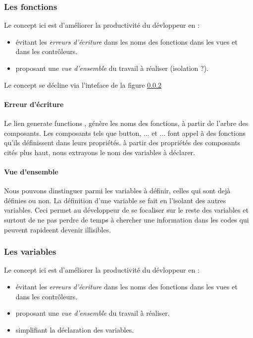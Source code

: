 \documentclass[a4paper,11pt]{report}
\begin{document}
	

\subsubsection{ Les fonctions}
Le concept ici est d'améliorer la productivité du dévloppeur en :
\begin{itemize}
\item évitant les {\em erreurs d'écriture} dans les noms des
fonctions dans les vues et dans les contrôleurs.
\item proposant une {\em vue d'ensemble} du travail à réaliser (isolation ?).
\end{itemize}

Le concept se décline via l'inteface de la figure \ref{}

\paragraph{Erreur d'écriture}
Le lien \og generate functions \fg, génère les noms des fonctions, à
partir de l'arbre des composants. Les composants tels que button,
... et ... font appel à des fonctions qu'ils définissent dans leurs
propriétés. à partir des propriétés des composants cités plus haut,
nous extrayons le nom des variables à déclarer.

\paragraph{Vue d'ensemble}
Nous pouvons dinstinguer parmi les variables à définir, celles qui
sont dejà définies ou non. La définition d'une variable se fait en
l'isolant des autres variables. Ceci permet au
développeur de se focaliser sur le reste des variables et surtout de
ne pas perdre de temps à chercher une information dans les codes qui
peuvent rapideent devenir illisibles.

\subsubsection{Les variables}
Le concept ici est d'améliorer la productivité du dévloppeur en :
\begin{itemize}
\item évitant les {\em erreurs d'écriture} dans les noms des
fonctions dans les vues et dans les contrôleurs.
\item proposant une {\em vue d'ensemble} du travail à réaliser.
\item simplifiant la déclaration des variables.

\end{itemize}
\end{document}
